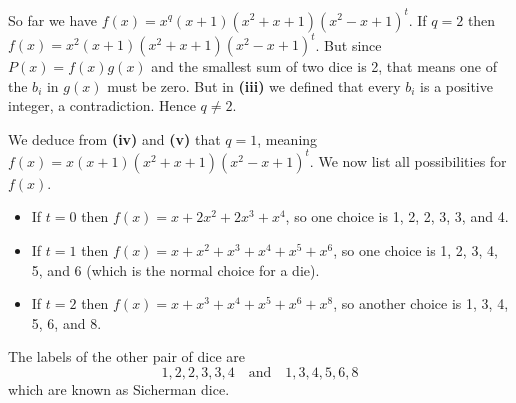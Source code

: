 \begin{questions}
\begin{partquestions}{\roman*}
        \item So far we have $f(x) = x^q(x+1)(x^2+x+1)(x^2-x+1)^t$. If $q = 2$ then $f(x) = x^2(x+1)(x^2+x+1)(x^2-x+1)^t$. But since $P(x) = f(x)g(x)$ and the smallest sum of two dice is 2, that means one of the $b_i$ in $g(x)$ must be zero. But in \textbf{(iii)} we defined that every $b_i$ is a positive integer, a contradiction. Hence $q \neq 2$.

        \item We deduce from \textbf{(iv)} and \textbf{(v)} that $q = 1$, meaning $f(x) = x(x+1)(x^2+x+1)(x^2-x+1)^t$. We now list all possibilities for $f(x)$.
        \begin{itemize}
            \item If $t = 0$ then $f(x) = x + 2x^2 + 2x^3 + x^4$, so one choice is 1, 2, 2, 3, 3, and 4.
            \item If $t = 1$ then $f(x) = x + x^2 + x^3 + x^4 + x^5 + x^6$, so one choice is 1, 2, 3, 4, 5, and 6 (which is the normal choice for a die).
            \item If $t = 2$ then $f(x) = x + x^3 + x^4 + x^5 + x^6 + x^8$, so another choice is 1, 3, 4, 5, 6, and 8.
        \end{itemize}

        \item The labels of the other pair of dice are
        \[
            1,2,2,3,3,4 \quad\text{and}\quad 1,3,4,5,6,8
        \]
        which are known as Sicherman dice.
    \end{partquestions}
\end{questions}
